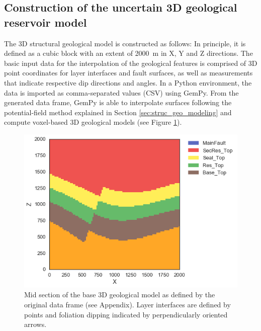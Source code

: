 		\subsection{Construction of the uncertain 3D geological reservoir model}\label{sec:3D_construction}
		The 3D structural geological model is constructed as follows: In principle, it is defined as a cubic block with an extent of 2000~m in X, Y and Z directions. The basic input data for the interpolation of the geological features is comprised of 3D point coordinates for layer interfaces and fault surfaces, as well as measurements that indicate respective dip directions and angles. In a Python environment, the data is imported as comma-separated values (CSV) using GemPy. From the generated data frame, GemPy is able to interpolate surfaces following the potential-field method explained in Section \ref{sec:struc_geo_modeling} and compute voxel-based 3D geological models (see Figure \ref{fig:3Dmodel_section}).
		
		\begin{figure}[h]
			\centering
			\includegraphics[width=1\textwidth]{Figures/3Dmodel_section.png}
			\caption{Mid section of the base 3D geological model as defined by the original data frame (see Appendix). Layer interfaces are defined by points and foliation dipping indicated by perpendicularly oriented arrows.}\label{fig:3Dmodel_section}
		\end{figure}
		
